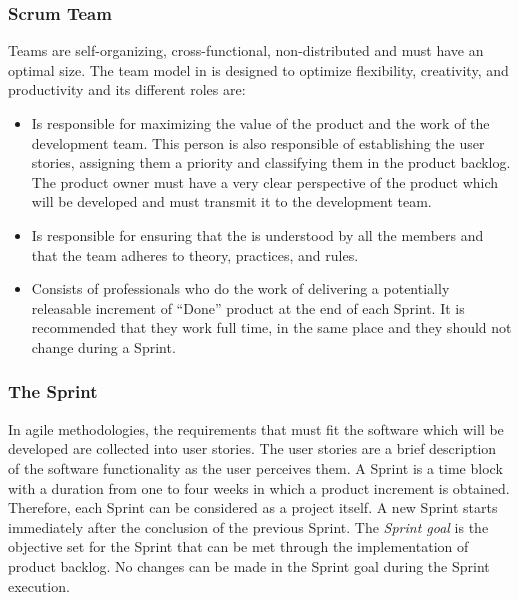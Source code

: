 \subsubsection{Scrum Team} \label{5-ScrumTeam}
 Teams are self-organizing, cross-functional, non-distributed and must have an optimal size. The team model in  is designed to optimize flexibility, creativity, and productivity and its different roles are:

\begin{itemize}
	\item {} Is responsible for maximizing the value of the product and the work of the	development team. This person is also responsible of establishing the user stories, assigning them a priority and classifying them in the product backlog. The product owner must have a very clear perspective of the product which will be developed and must transmit it to the development team.
	
	\item {} Is responsible for ensuring that the  is understood by all the members and that the  team adheres to  theory, practices, and rules. 
	
	\item {} Consists of professionals who do the work of delivering a potentially releasable increment of “Done” product at the end of each Sprint. It is recommended that they work full time, in the same place and they should not change during a Sprint.
\end{itemize}


\subsubsection{The Sprint}

In agile methodologies, the requirements that must fit the software which will be developed are collected into user stories. The user stories \cite{Coh04} are a brief description of the software functionality as the user perceives them. A Sprint is a time block with a duration from one to four weeks in which a product increment is obtained. Therefore, each Sprint can be considered as a project itself. A new Sprint starts immediately after the conclusion of the previous Sprint. The \emph{Sprint goal} is the objective set for the Sprint that can be met through the implementation of product backlog. No changes can be made in the Sprint goal during the Sprint execution. 


